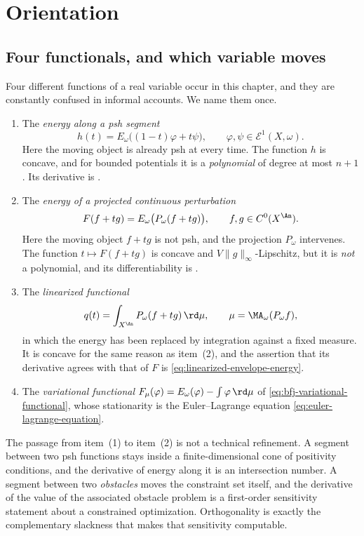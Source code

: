 \section{Orientation}
\label{sec:ch27-orientation}

\subsection{Four functionals, and which variable moves}
\label{sec:ch27-four-functionals}

Four different functions of a real variable occur in this chapter, and they
are constantly confused in informal accounts.  We name them once.

\begin{enumerate}
\item
The \emph{energy along a psh segment}
\[
 h(t)=E_\omega\bigl((1-t)\varphi+t\psi\bigr),
 \qquad \varphi,\psi\in\mathcal E^1(X,\omega).
\]
Here the moving object is already psh at every time.  The function \(h\) is
concave, and for bounded potentials it is a \emph{polynomial} of degree at
most \(n+1\).  Its derivative is .
\item
The \emph{energy of a projected continuous perturbation}
\[
 F(f+tg)=E_\omega\bigl(P_\omega(f+tg)\bigr),
 \qquad f,g\in C^0(X^{\An}).
\]
Here the moving object \(f+tg\) is not psh, and the projection \(P_\omega\)
intervenes.  The function \(t\mapsto F(f+tg)\) is concave and
\(V\lVert g\rVert_\infty\)-Lipschitz, but it is \emph{not} a polynomial, and
its differentiability is .
\item
The \emph{linearized functional}
\[
 q(t)=\int_{X^{\An}}P_\omega(f+tg)\,\rd\mu,
 \qquad \mu=\MA_\omega(P_\omega f),
\]
in which the energy has been replaced by integration against a fixed
measure.  It is concave for the same reason as
item~(2), and the assertion that its derivative
agrees with that of \(F\) is \eqref{eq:linearized-envelope-energy}.
\item
The \emph{variational functional}
\(F_\mu(\varphi)=E_\omega(\varphi)-\int\varphi\,\rd\mu\) of
\eqref{eq:bfj-variational-functional}, whose stationarity is the
Euler--Lagrange equation \eqref{eq:euler-lagrange-equation}.
\end{enumerate}

The passage from item~(1) to
item~(2) is not a technical refinement.  A segment
between two psh functions stays inside a finite-dimensional cone of
positivity conditions, and the derivative of energy along it is an
intersection number.  A segment between two \emph{obstacles} moves the
constraint set itself, and the derivative of the value of the associated
obstacle problem is a first-order sensitivity statement about a
constrained optimization.  Orthogonality is exactly the complementary
slackness that makes that sensitivity computable.

